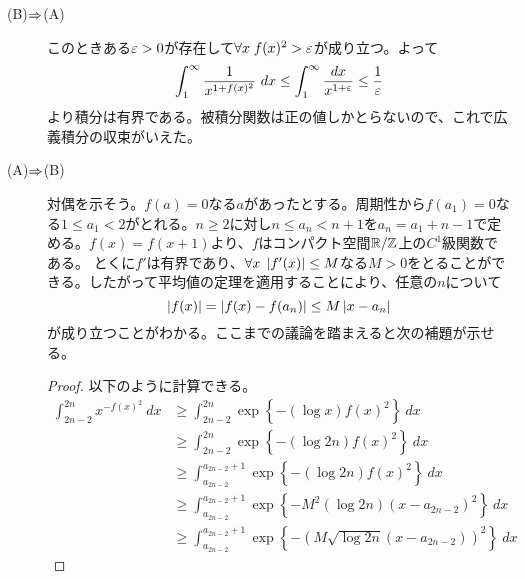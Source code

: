 \begin{sol} ${}$
  \begin{description}
    \item[(B)$\Rightarrow$(A)] このときある${\varepsilon} > 0$が存在して$\forall x \; f(x)^2 > {\varepsilon}$が成り立つ。よって
    \begin{align*}
            \int_1^{\infty} \frac{1}{x^{1+f(x)^2}} \ dx \leq \int_1^{\infty} \frac{dx}{x^{1+{\varepsilon}}}
            \leq \frac{1}{{\varepsilon}}
    \end{align*}
    より積分は有界である。被積分関数は正の値しかとらないので、これで広義積分の収束がいえた。
    \item[(A)$\Rightarrow$(B)] 対偶を示そう。$f(a)=0$なる$a$があったとする。周期性から$f(a_1)=0$なる$1 \leq a_1 < 2$がとれる。$n \geq 2$に対し$ n \leq a_n < n+1$を$a_n = a_1 + n-1$で定める。$f(x)=f(x+1)$より、$f$はコンパクト空間${\mathbb R} / {\mathbb Z}$上の$C^1$級関数である。
    とくに$f'$は有界であり、$\forall x \; \left \lvert f'(x) \right \rvert \leq M$なる$M > 0$をとることができる。したがって平均値の定理を適用することにより、任意の$n$について
    \[
    \left \lvert f(x) \right \rvert = \left \lvert f(x) - f(a_n) \right \rvert \leq M \left \lvert x - a_n \right \rvert
    \]
    が成り立つことがわかる。ここまでの議論を踏まえると次の補題が示せる。
\begin{proof}
  以下のように計算できる。
  \begin{align*}
    \int_{2n-2}^{2n} x^{-f(x)^2} \ dx  &\geq \int_{2n-2}^{2n} \exp \left\{ - (\log x) f(x)^2 \right\} \ dx \\
    &\geq \int_{2n-2}^{2n} \exp \left\{ - (\log 2n) f(x)^2 \right\} \ dx \\
　　&\geq \int_{a_{2n-2}}^{a_{2n-2}+1} \exp \left\{ - (\log 2n) f(x)^2 \right\} \ dx \\
　　&\geq \int_{a_{2n-2}}^{a_{2n-2}+1} \exp \left\{ - M^2(\log 2n) (x-a_{2n-2})^2 \right\} \ dx \\
　　&\geq \int_{a_{2n-2}}^{a_{2n-2}+1} \exp \left\{ - (M \sqrt{\log 2n} (x-a_{2n-2}) )^2 \right\} \ dx
\end{align*}

\end{proof}
\end{description}
\end{sol}
